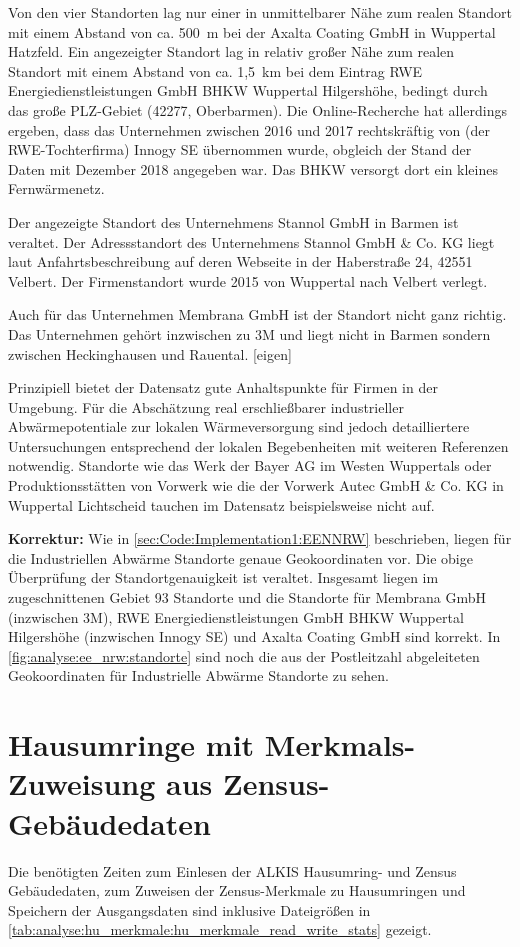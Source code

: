 		Von den vier Standorten lag nur einer in unmittelbarer Nähe zum realen Standort mit einem Abstand von ca. 500~m bei der Axalta Coating GmbH in Wuppertal Hatzfeld. Ein angezeigter Standort lag in relativ großer Nähe zum realen Standort mit einem Abstand von ca. 1,5~km bei dem Eintrag RWE Energiedienstleistungen GmbH BHKW Wuppertal Hilgershöhe, bedingt durch das große PLZ-Gebiet (42277, Oberbarmen). Die Online-Recherche hat allerdings ergeben, dass das Unternehmen zwischen 2016 und 2017 rechtskräftig von (der RWE-Tochterfirma) Innogy SE übernommen wurde, obgleich der Stand der Daten mit Dezember 2018 angegeben war. Das BHKW versorgt dort ein kleines Fernwärmenetz. \cite{web_beschluss_innogy_se_wuppertal_hilgershoehe}
		
		Der angezeigte Standort des Unternehmens Stannol GmbH in Barmen ist veraltet. Der Adressstandort des Unternehmens Stannol GmbH \& Co. KG liegt laut Anfahrtsbeschreibung auf deren Webseite in der Haberstraße 24, 42551 Velbert. Der Firmenstandort wurde 2015 von Wuppertal nach Velbert verlegt. \cite{web_firma_stannol_gmbh}
		
		Auch für das Unternehmen Membrana GmbH ist der Standort nicht ganz richtig. Das Unternehmen gehört inzwischen zu 3M und liegt nicht in Barmen sondern zwischen Heckinghausen und Rauental. [eigen]
		
		Prinzipiell bietet der Datensatz gute Anhaltspunkte für Firmen in der Umgebung. Für die Abschätzung real erschließbarer industrieller Abwärmepotentiale zur lokalen Wärmeversorgung sind jedoch detailliertere Untersuchungen entsprechend der lokalen Begebenheiten mit weiteren Referenzen notwendig. Standorte wie das Werk der Bayer AG im Westen Wuppertals oder Produktionsstätten von Vorwerk wie die der Vorwerk Autec GmbH \& Co. KG in Wuppertal Lichtscheid tauchen im Datensatz beispielsweise nicht auf. 
		
		\textbf{Korrektur:} Wie in \autoref{sec:Code:Implementation1:EENNRW} beschrieben, liegen für die Industriellen Abwärme Standorte genaue Geokoordinaten vor. Die obige Überprüfung der Standortgenauigkeit ist veraltet. Insgesamt liegen im zugeschnittenen Gebiet 93 Standorte und die Standorte für Membrana GmbH (inzwischen 3M), RWE Energiedienstleistungen GmbH BHKW Wuppertal Hilgershöhe (inzwischen Innogy SE) und Axalta Coating GmbH sind korrekt. In \autoref{fig:analyse:ee_nrw:standorte} sind noch die aus der Postleitzahl abgeleiteten Geokoordinaten für Industrielle Abwärme Standorte zu sehen. 
		

	\section{Hausumringe mit Merkmals-Zuweisung aus Zensus-Gebäudedaten}
		Die benötigten Zeiten zum Einlesen der ALKIS Hausumring- und Zensus Gebäudedaten, zum Zuweisen der Zensus-Merkmale zu Hausumringen und Speichern der Ausgangsdaten sind inklusive Dateigrößen in \autoref{tab:analyse:hu_merkmale:hu_merkmale_read_write_stats} gezeigt. 
		
